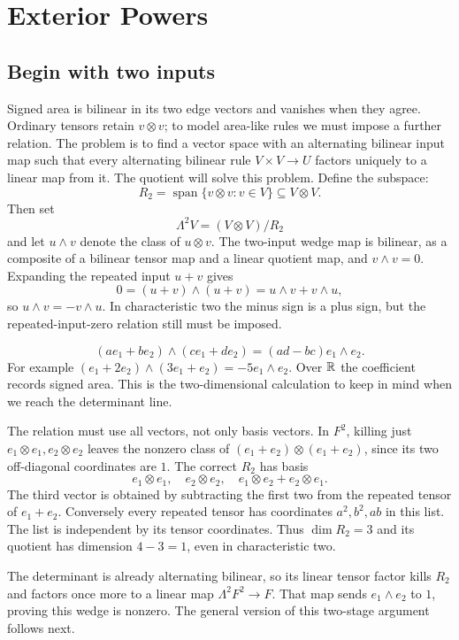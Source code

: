 \section{Exterior Powers}
\label{sec:exterior-quotients}
\subsection{Begin with two inputs}
Signed area is bilinear in its two edge vectors and vanishes when they
agree. Ordinary tensors retain $v\otimes v$; to model area-like rules
we must impose a further relation. The problem is to find a vector space
with an alternating bilinear input map such that every alternating
bilinear rule $V\times V\to U$ factors uniquely to a linear map from it.
The quotient will solve this problem. Define the subspace:
\[
R_2=\operatorname{span}\{v\otimes v:v\in V\}\subseteq V\otimes V.
\]
Then set
\[
\Lambda^2V=(V\otimes V)/R_2
\]
 and let $u\wedge v$ denote the
class of $u\otimes v$. The two-input wedge map is bilinear, as a composite
of a bilinear tensor map and a linear quotient map, and $v\wedge v=0$.
Expanding the repeated input $u+v$ gives
\[
0=(u+v)\wedge(u+v)=u\wedge v+v\wedge u,
\]
so $u\wedge v=-v\wedge u$. In characteristic two the minus sign is a
plus sign, but the repeated-input-zero relation still must be imposed.

\[
\boxed{(ae_1+be_2)\wedge(ce_1+de_2)=(ad-bc)e_1\wedge e_2.}
\]
For example $(e_1+2e_2)\wedge(3e_1+e_2)=-5e_1\wedge e_2$.
Over $\mathbb{R}$ the coefficient records signed area. This is the two-dimensional
calculation to keep in mind when we reach the determinant line.

The relation must use all vectors, not only basis vectors. In $F^2$,
killing just $e_1\otimes e_1,e_2\otimes e_2$ leaves the nonzero class
of $(e_1+e_2)\otimes(e_1+e_2)$, since its two off-diagonal coordinates
are $1$. The correct $R_2$ has basis
\[
e_1\otimes e_1,\quad e_2\otimes e_2,\quad
e_1\otimes e_2+e_2\otimes e_1.
\]
The third vector is obtained by subtracting the first two from the repeated
tensor of $e_1+e_2$. Conversely every repeated tensor has coordinates
$a^2,b^2,ab$ in this list. The list is independent by its tensor
coordinates. Thus $\dim R_2=3$ and its quotient has dimension $4-3=1$, even
in characteristic two.

The determinant is already alternating bilinear, so its linear tensor
factor kills $R_2$ and factors once more to a linear map $\Lambda^2F^2\to F$.
That map sends $e_1\wedge e_2$ to $1$, proving this wedge is nonzero.
The general version of this two-stage argument follows next.


